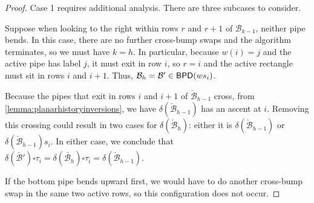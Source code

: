 \documentclass[12 pt]{amsart}
\numberwithin{equation}{section}
\theoremstyle{remark}
\newcommand{\bpd}{{\sf BPD}}
\newcommand{\demprod}{\delta}
\begin{document}
\begin{proof}
Case 1 requires additional analysis. There are three subcases to consider.
			
			 Suppose when looking to the right within rows $r$ and $r + 1$ of $\mathcal{B}_{k-1}$, neither pipe bends. 
			In this case, there are no further cross-bump swaps and the algorithm terminates, so we must have $k = h$. 
			In particular, because $w(i)=j$ and the active pipe has label $j$, it must exit in row $i$, so $r=i$ and the active rectangle must sit in rows $i$ and $i + 1$. 
			Thus, $\mathcal{B}_h = \mathcal{B}' \in \bpd(ws_i)$.
			
			
			Because the pipes that exit in rows $i$ and $i + 1$ of $\check{\mathcal{B}}_{h-1}$ cross, from \cref{lemma:planarhistoryinversions}, we have $\demprod(\check{\mathcal{B}}_{h-1})$ has an ascent at $i$. 
			Removing this crossing could result in two cases for $\demprod(\check{\mathcal{B}}_{h})$: either it is $\demprod(\check{\mathcal{B}}_{h-1})$ or $\demprod(\check{\mathcal{B}}_{h-1})s_i$. In either case, we conclude that $\demprod(\check{\mathcal{B}'})\square \tau_i =\demprod(\check{\mathcal{B}_h})\square \tau_i= \demprod(\check{\mathcal{B}}_{h-1})$.
			
			 If the bottom pipe bends upward first, we would have to do another cross-bump swap in the same two active rows, so this configuration does not occur.
			

\end{proof}
\end{document}
